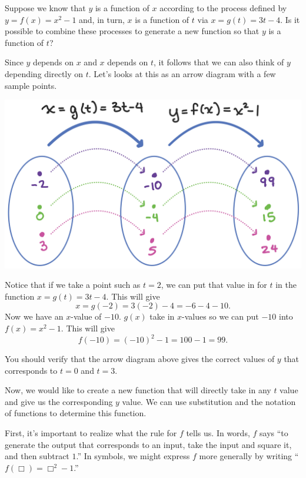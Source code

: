 \documentclass{ximera}
\begin{document}
\begin{example}
Suppose we know that $y$ is a function of $x$ according to the process defined by $y = f(x) = x^2 - 1$ and, in turn, $x$ is a function of $t$ via $x = g(t) = 3t-4$.  Is it possible to combine these processes to generate a new function so that $y$ is a function of $t$?

\begin{explanation}
Since $y$ depends on $x$ and $x$ depends on $t$, it follows that we can also think of $y$ depending directly on $t$.  Let's looks at this as an arrow diagram with a few sample points.

\begin{image}
\includegraphics[width=\textwidth]{CompositionText.jpg}
\end{image}

Notice that if we take a point such as $t=2$, we can put that value in for $t$ in the function $x = g(t) = 3t-4$.  This will give $$x = g(-2) = 3(-2)-4=-6-4-10.$$
Now we have an $x$-value of $-10$.  $g(x)$ take in $x$-values so we can put $-10$ into $f(x)=x^2-1$.  This will give $$f(-10)=(-10)^2-1=100-1=99.$$

You should verify that the arrow diagram above gives the correct values of $y$ that corresponds to $t=0$ and $t=3$.

Now, we would like to create a new function that will directly take in any $t$ value and give us the corresponding $y$ value.  We can use substitution and the notation of functions to determine this function.

First, it's important to realize what the rule for $f$ tells us.  In words, $f$ says ``to generate the output that corresponds to an input, take the input and square it, and then subtract $1$.''  In symbols, we might express $f$ more generally by writing ``$f(\Box) = \Box^2 - 1$.''


\end{explanation}
\end{example}
\end{document}
